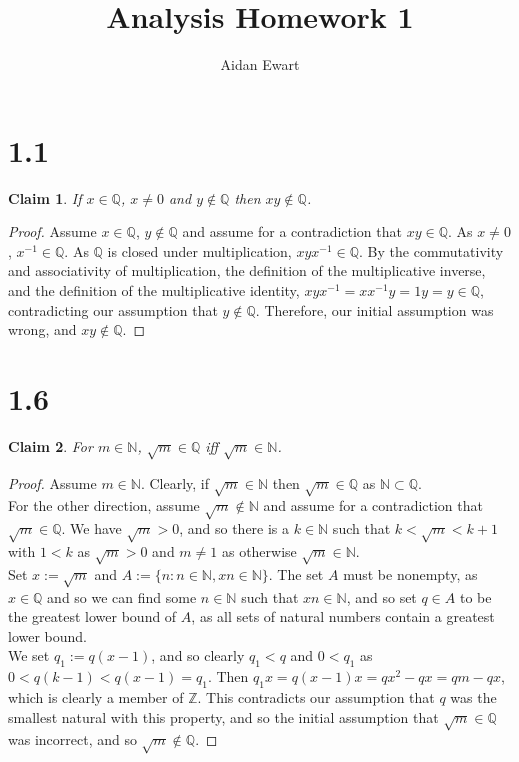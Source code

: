 \documentclass{article}
\title{Analysis Homework 1}
\author{Aidan Ewart}
\theoremstyle{plain}
\newtheorem*{claim}{Claim}
\begin{document}
\maketitle

\section*{1.1}

\begin{claim}
    If $x \in \mathbb{Q}$, $x \neq 0$ and $y \notin \mathbb{Q}$ then $xy \notin \mathbb{Q}$.
\end{claim}
\begin{proof}
    Assume $x \in \mathbb{Q}$, $y \notin \mathbb{Q}$ and assume for a contradiction that $xy \in \mathbb{Q}$. As $x \neq 0$, $x^{-1} \in \mathbb{Q}$. As $\mathbb{Q}$ is closed under multiplication, $xyx^{-1} \in \mathbb{Q}$. By the commutativity and associativity of multiplication, the definition of the multiplicative inverse, and the definition of the multiplicative identity, $xyx^{-1} = xx^{-1}y = 1y = y \in \mathbb{Q}$, contradicting our assumption that $y \notin \mathbb{Q}$. Therefore, our initial assumption was wrong, and $xy \notin \mathbb{Q}$.
\end{proof}

\section*{1.6}

\begin{claim}
    For $m \in \mathbb{N}$, $\sqrt{m} \in \mathbb{Q}$ iff $\sqrt{m} \in \mathbb{N}$.
\end{claim}
\begin{proof}
    Assume $m \in \mathbb{N}$. Clearly, if $\sqrt{m} \in \mathbb{N}$ then $\sqrt{m} \in \mathbb{Q}$ as $\mathbb{N} \subset \mathbb{Q}$. \\
    For the other direction, assume $\sqrt{m} \notin \mathbb{N}$ and assume for a contradiction that $\sqrt{m} \in \mathbb{Q}$. We have $\sqrt{m} > 0$, and so there is a $k \in \mathbb{N}$ such that $k < \sqrt{m} < k + 1$ with $1 < k$ as $\sqrt{m} > 0$ and $m \neq 1$ as otherwise $\sqrt{m} \in \mathbb{N}$. \\
    Set $x := \sqrt{m}$ and $A := \{n : n \in \mathbb{N}, xn \in \mathbb{N}\}$. The set $A$ must be nonempty, as $x \in \mathbb{Q}$ and so we can find some $n \in \mathbb{N}$ such that $xn \in \mathbb{N}$, and so set $q \in A$ to be the greatest lower bound of $A$, as all sets of natural numbers contain a greatest lower bound. \\
    We set $q_1 := q(x-1)$, and so clearly $q_1 < q$ and $0 < q_1$ as $0 < q(k - 1) < q(x - 1) = q_1$. Then $q_1 x = q(x-1)x = qx^2 - qx = qm - qx$, which is clearly a member of $\mathbb{Z}$. This contradicts our assumption that $q$ was the smallest natural with this property, and so the initial assumption that $\sqrt{m} \in \mathbb{Q}$ was incorrect, and so $\sqrt{m} \notin \mathbb{Q}$.
\end{proof}
\end{document}
